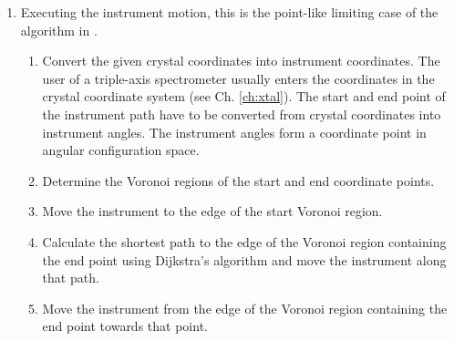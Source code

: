 \begin{enumerate}
	\item Executing the instrument motion, this is the point-like limiting case of the algorithm in \cite[p. 163]{Berg2008}.
	\begin{enumerate}
		\item Convert the given crystal coordinates into instrument coordinates.
			The user of a triple-axis spectrometer usually enters the coordinates in the crystal coordinate system
			(see Ch. \ref{ch:xtal}). The start and end point of the instrument path have to be converted from crystal
			coordinates into instrument angles. The instrument angles form a coordinate point in angular configuration
			space.
		\item Determine the Voronoi regions of the start and end coordinate points.
		\item Move the instrument to the edge of the start Voronoi region.
		\item Calculate the shortest path to the edge of the Voronoi region containing the end point using Dijkstra's algorithm \cite{wiki_dijkstra}
			and move the instrument along that path.
		\item Move the instrument from the edge of the Voronoi region containing the end point towards that point.
	\end{enumerate}
\end{enumerate}
